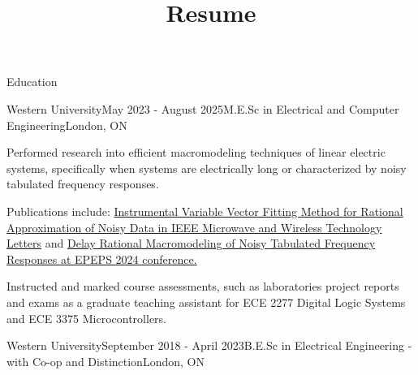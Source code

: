 \documentclass{resume} %
\begin{document}
\title{Resume}

\begin{rSection}{Education}
\begin{rSubsection}{Western University}{May 2023 - August 2025}{M.E.Sc in Electrical and Computer Engineering}{London, ON}
\item Performed research into efficient macromodeling techniques of linear electric systems, specifically when systems are electrically long or characterized by noisy tabulated frequency responses.
\item Publications include: \href{https://ieeexplore.ieee.org/document/11112764}{Instrumental Variable Vector Fitting Method for Rational Approximation of Noisy Data in IEEE Microwave and Wireless Technology Letters} and \href{https://ieeexplore.ieee.org/document/10754128}{Delay Rational Macromodeling of Noisy Tabulated Frequency Responses at EPEPS 2024 conference.}
\item Instructed and marked course assessments, such as laboratories project reports and exams as a graduate teaching assistant for ECE 2277 Digital Logic Systems and ECE 3375 Microcontrollers.
\end{rSubsection}

\begin{rSubsection}{Western University}{September 2018 - April 2023}{B.E.Sc in Electrical Engineering - with Co-op and Distinction}{London, ON}
\vspace{-.65cm}
\item[]
\end{rSubsection}
\end{rSection}
\end{document}
